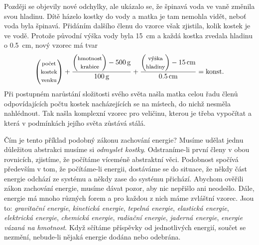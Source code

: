 {    Později se objevily nové odchylky, ale ukázalo se, že špinavá voda ve vaně změnila svou 
    hladinu. Dítě házelo kostky do vody a matka je tam nemohla vidět, neboť voda byla špinavá. 
    Přidáním dalšího členu do vzorce však zjistila, kolik kostek je ve vodě. Protože původní výška 
    vody byla \SI{15}{\cm} a každá kostka zvedala hladinu o \SI{0.5}{\cm}, nový vzorec má tvar
    \begin{equation*}
        \begin{pmatrix} 
          \text{\footnotesize{počet}}   \\
          \text{\footnotesize{kostek}}  \\
          \text{\footnotesize{venku}}
        \end{pmatrix}
       +
      \frac{
            \begin{pmatrix}
              \text{\footnotesize{hmotnost}}  \\
              \text{\footnotesize{krabice}}
            \end{pmatrix}
        - \SI{500}{\gram}}{ \SI{100}{\gram}} +
      \frac{
            \begin{pmatrix}
              \text{\footnotesize{výška}}  \\
              \text{\footnotesize{hladiny}}
            \end{pmatrix}
        - \SI{15}{\cm}}{ \SI{0.5}{\cm}} = 
      \text{konst.}
    \end{equation*}
    Při postupném narůstání složitosti svého světa našla matka celou řadu členů odpovídajících 
    počtu kostek nacházejících se na místech, do nichž nesměla nahlédnout. Tak našla komplexní 
    vzorec pro veličinu, kterou je třeba vypočítat a která v podmínkách jejího světa zůstává stálá.
    
    Čím je tento příklad podobný zákonu zachování energie? Musíme udělat jednu důležitou abstrakci 
    musíme si \emph{odmyslet kostky}. Odstraníme-li první členy v obou rovnicích, zjistíme, že 
    počítáme víceméně abstraktní věci. Podobnost spočívá především v tom, že počítáme-li energii, 
    dostáváme se do situace, že někdy část energie odchází ze systému a někdy zase do systému 
    přichází. Abychom ověřili zákon zachování energie, musíme dávat pozor, aby nic nepřišlo ani 
    neodešlo. Dále, energie má mnoho různých forem a pro každou z nich máme zvláštní vzorec. Jsou 
    to: \emph{gravitační energie}, \emph{kinetická energie}, \emph{tepelná energie}, 
    \emph{elastická energie}, \emph{elektrická energie}, \emph{chemická energie}, \emph{radiační 
    energie}, \emph{jaderná energie}, \emph{energie vázaná na hmotnost}. Když sčítáme příspěvky od 
    jednotlivých energií, součet se nezmění, nebude-li nějaká energie dodána nebo odebrána.
    
}
